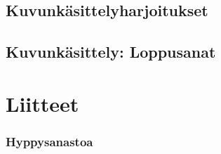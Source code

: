 \documentclass[10pt,twoside,openany,hidelinks]{memoir}
\begin{document}
\chapter{Kuvunkäsittelyharjoitukset}
\label{kuvunkasittelyharjoitukset}
\thispagestyle{headings}
\begin{multicols}{2}
\end{multicols}

\chapter{Kuvunkäsittely: Loppusanat}
\label{kuvunkasittely-loppusanat}
\thispagestyle{headings}
\begin{multicols}{2}
\end{multicols}

\part{Liitteet}\pagestyle{simple}
\appendix




\section*{Hyppysanastoa}
\label{hyppysanastoa}
\begin{multicols}{2}
\end{multicols}
\end{document}
